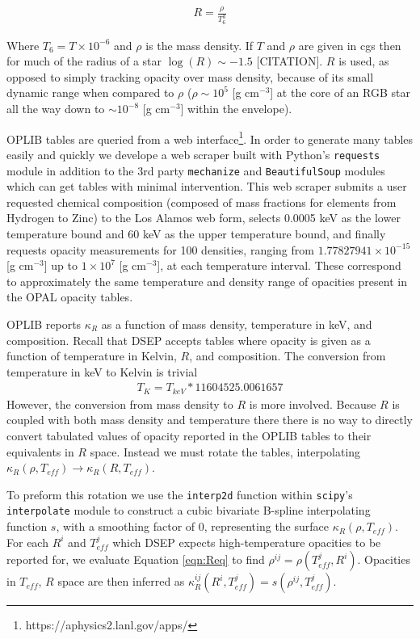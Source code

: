 \begin{align} \label{eqn:Req}
	R = \frac{\rho}{T_{6}^{3}}
\end{align}

Where $T_{6} = T\times10^{-6}$ and $\rho$ is the mass density. If $T$ and
$\rho$ are given in cgs then for much of the radius of a star $\log(R)\sim-1.5$
{\color{red}[CITATION]}.  $R$ is used, as opposed to simply tracking opacity
over mass density, because of its small dynamic range when compared to $\rho$ ($\rho\sim
10^{5}$ [g cm$^{-3}$] at the core of an RGB star all the way down to $\sim
10^{-8}$ [g cm$^{-3}$] within the envelope). 

OPLIB tables are queried from a web
interface\footnote{https://aphysics2.lanl.gov/apps/}. In order to generate many
tables easily and quickly we develope a web scraper built with Python's
\texttt{requests} module in addition to the 3rd party \texttt{mechanize} and
\texttt{BeautifulSoup} modules \citep{chandra2015python,
richardson2007beautiful} which can get tables with minimal intervention. This
web scraper submits a user requested chemical composition (composed of mass
fractions for elements from Hydrogen to Zinc) to the Los Alamos web form,
selects 0.0005 keV as the lower temperature bound and 60 keV as the upper
temperature bound, and finally requests opacity measurements for 100 densities,
ranging from $1.77827941\times 10 ^{-15}$ [g cm$^{-3}$] up to $1\times10^{7}$
[g cm$^{-3}$], at each temperature interval. These correspond to approximately
the same temperature and density range of opacities present in the OPAL opacity
tables.

OPLIB reports $\kappa_{R}$ as a function of mass density, temperature in keV,
and composition. Recall that DSEP accepts tables where opacity is given as a
function of temperature in Kelvin, $R$, and composition. The conversion from
temperature in keV to Kelvin is trivial
\begin{align}
	T_{K} = T_{keV} * 11604525.0061657
\end{align}
However, the conversion from mass density to $R$ is more involved. Because $R$ is
coupled with both mass density and temperature there there is no way to
directly convert tabulated values of opacity reported in the OPLIB tables to
their equivalents in $R$ space. Instead we must rotate the tables,
interpolating $\kappa_{R}(\rho,T_{eff}) \rightarrow \kappa_{R}(R,T_{eff})$. 

To preform this rotation we use the \texttt{interp2d} function within
\texttt{scipy}'s \texttt{interpolate} \citep{2020SciPy-NMeth} module to
construct a cubic bivariate B-spline \citep{Dierckx1981} interpolating function
$s$, with a smoothing factor of 0, representing the surface $\kappa_{R}(\rho,
T_{eff})$. For each $R^{i}$ and $T^{j}_{eff}$ which DSEP expects
high-temperature opacities to be reported for, we evaluate Equation
\ref{eqn:Req} to find $\rho^{ij} = \rho(T^{j}_{eff},R^{i})$.  Opacities in
$T_{eff}$, $R$ space are then inferred as $\kappa^{ij}_{R}(R^{i},T^{j}_{eff}) =
s(\rho^{ij}, T^{j}_{eff})$. 

